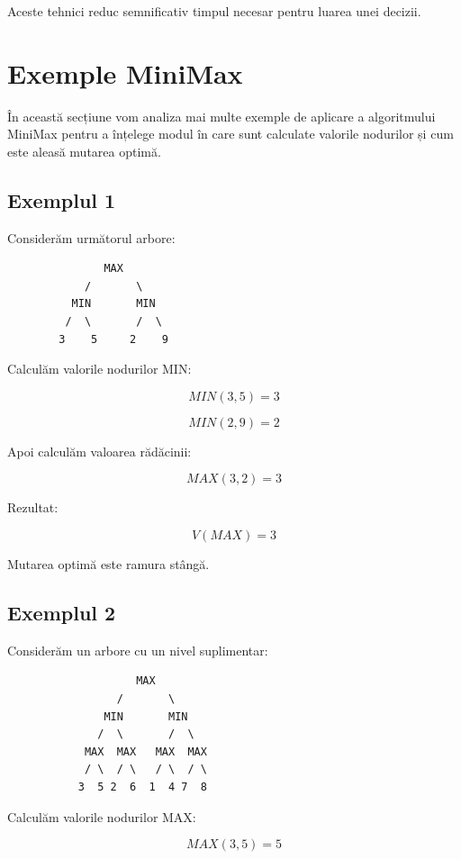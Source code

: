 \documentclass[12pt,a4paper]{article}
\begin{document}
Aceste tehnici reduc semnificativ timpul necesar pentru luarea unei decizii.










\section{Exemple MiniMax}

În această secțiune vom analiza mai multe exemple de aplicare a algoritmului MiniMax pentru a înțelege modul în care sunt calculate valorile nodurilor și cum este aleasă mutarea optimă.

\subsection{Exemplul 1}

Considerăm următorul arbore:

\begin{verbatim}
               MAX
            /       \
          MIN       MIN
         /  \       /  \
        3    5     2    9
\end{verbatim}

Calculăm valorile nodurilor MIN:

\[
MIN(3,5)=3
\]

\[
MIN(2,9)=2
\]

Apoi calculăm valoarea rădăcinii:

\[
MAX(3,2)=3
\]

Rezultat:

\[
V(MAX)=3
\]

Mutarea optimă este ramura stângă.

\subsection{Exemplul 2}

Considerăm un arbore cu un nivel suplimentar:

\begin{verbatim}
                    MAX
                 /       \
               MIN       MIN
              /  \       /  \
            MAX  MAX   MAX  MAX
            / \  / \   / \  / \
           3  5 2  6  1  4 7  8
\end{verbatim}

Calculăm valorile nodurilor MAX:

\[
MAX(3,5)=5
\]
\end{document}

